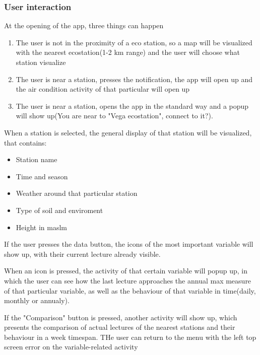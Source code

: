 \documentclass[12pt]{article} %
\begin{document}
\subsubsection{User interaction}
At the opening of the app, three things can happen
\begin{enumerate}
    \item The user is not in the proximity of a eco station, so a map will be visualized with the nearest ecostation(1-2 km range) and the user will choose what station visualize
    \item The user is near a station, presses the notification, the app will open up and the air condition activity of that particular  will open up
    \item The user is near a station, opens the app in the standard way and a popup will show up(You are near to "Vega ecostation", connect to it?).
\end{enumerate}


When a station is selected, the general display of that station will be visualized, that contains:
\begin{itemize}
\item Station name
\item Time and season
\item Weather around that particular station
\item Type of soil and enviroment
\item Height in maslm
\end{itemize}

If the user presses the data button, the icons of the most important variable will show up, with their current lecture already visible.

When an icon is pressed, the activity of that certain variable will popup up, in which the user can see how the last lecture approaches the annual max measure of that particular variable, as well as the behaviour of that variable in time(daily, monthly or annualy).

If the "Comparison" button is pressed, another activity will show up, which presents the comparison of actual lectures of the nearest stations and their behaviour in a week timespan.
THe user can return to the menu with the left top screen error on the variable-related activity
\end{document}
